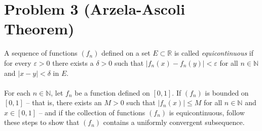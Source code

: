 \documentclass[12pt]{article}
\newcommand{\ep}{\varepsilon}
\begin{document}
\section*{Problem 3 (Arzela-Ascoli Theorem)}
A sequence of functions $(f_n)$ defined on a set $E\subset\mathbb{R}$ is called \textit{equicontinuous} if for every $\ep>0$ there exists a $\delta>0$ such that $|f_n(x)-f_n(y)|<\ep$ for all $n\in\mathbb{N}$ and $|x-y|<\delta$ in $E$. \\ \\
For each $n\in\mathbb{N}$, let $f_n$ be a function defined on $[0,1]$. If $(f_n)$ is bounded on $[0,1]$ -- that is, there exists an $M>0$ such that $|f_n(x)|\leq M$ for all $n\in\mathbb{N}$ and $x\in[0,1]$ -- and if the collection of functions $(f_n)$ is equicontinuous, follow these steps to show that $(f_n)$ contains a uniformly convergent subsequence.
\end{document}
